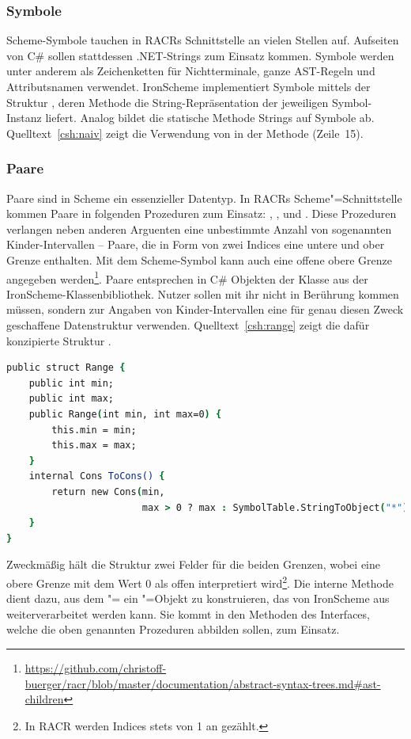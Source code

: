 \subsubsection{Symbole}

Scheme-Symbole tauchen in RACRs Schnittstelle an vielen Stellen auf. Aufseiten von C\# sollen stattdessen .NET-Strings zum Einsatz kommen. Symbole werden unter anderem als Zeichenketten für Nichtterminale, ganze AST-Regeln und Attributsnamen verwendet. IronScheme implementiert Symbole mittels der Struktur , deren  Methode die String-Repräsentation der jeweiligen Symbol-Instanz liefert. Analog bildet die statische Methode  Strings auf Symbole ab. Quelltext~\ref{csh:naiv} zeigt die Verwendung von  in der Methode  (Zeile~15).

\subsubsection{Paare}

Paare sind in Scheme ein essenzieller Datentyp. In RACRs Scheme"=Schnittstelle kommen Paare in folgenden Prozeduren zum Einsatz: , ,  und . Diese Prozeduren verlangen neben anderen Arguenten eine unbestimmte Anzahl von sogenannten Kinder-Intervallen – Paare, die in Form von zwei Indices eine untere und ober Grenze enthalten. Mit dem Scheme-Symbol  kann auch eine offene obere Grenze angegeben werden\footnote{\url{https://github.com/christoff-buerger/racr/blob/master/documentation/abstract-syntax-trees.md\#ast-children}}. Paare entsprechen in C\# Objekten der Klasse  aus der IronScheme-Klassenbibliothek. Nutzer sollen mit ihr nicht in Berührung kommen müssen, sondern zur Angaben von Kinder-Intervallen eine für genau diesen Zweck geschaffene Datenstruktur verwenden. Quelltext~\ref{csh:range} zeigt die dafür konzipierte Struktur .

\begin{lstlisting}[language=csh, caption={Definition der \csh{Range}"=Struktur}, label=csh:range]
public struct Range {
	public int min;
	public int max;
	public Range(int min, int max=0) {
		this.min = min;
		this.max = max;
	}
	internal Cons ToCons() {
		return new Cons(min,
						max > 0 ? max : SymbolTable.StringToObject("*"));
	}
}
\end{lstlisting}

Zweckmäßig hält die Struktur zwei Felder für die beiden Grenzen, wobei eine obere Grenze mit dem Wert 0 als offen interpretiert wird\footnote{In RACR werden Indices stets von 1 an gezählt.}. Die interne Methode  dient dazu, aus dem "= ein "=Objekt zu konstruieren, das von IronScheme aus weiterverarbeitet werden kann. Sie kommt in den Methoden des Interfaces, welche die oben genannten Prozeduren abbilden sollen, zum Einsatz.

